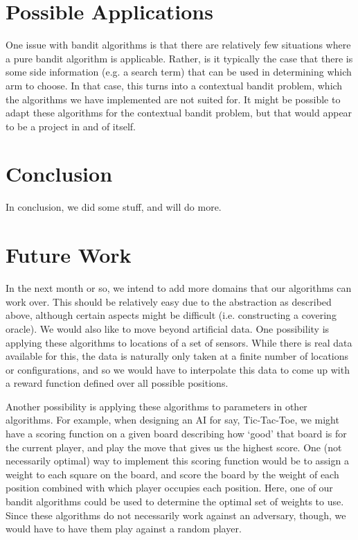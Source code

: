 \documentclass{article}
\begin{document}
\section{Possible Applications}
One issue with bandit algorithms is that there are relatively few
situations where a pure bandit algorithm is applicable.  Rather, is it
typically the case that there is some side information (e.g. a search term)
that can be used in determining which arm to choose.  In that case, this
turns into a contextual bandit problem, which the algorithms we have
implemented are not suited for.  It might be possible to adapt these
algorithms for the contextual bandit problem, but that would appear to be
a project in and of itself.
\\
\section{Conclusion}
In conclusion, we did some stuff, and will do more.
\\
\section{Future Work}
In the next month or so, we intend to add more domains that our algorithms
can work over.  This should be relatively easy due to the abstraction
as described above, although certain aspects might be difficult (i.e.
constructing a covering oracle).  We would also like to move beyond
artificial data.  One possibility is applying these algorithms to
locations of a set of sensors.  While there is real data available for 
this, the data is naturally only taken at a finite number of locations
or configurations, and so we would have to interpolate this data to come
up with a reward function defined over all possible positions.

Another possibility is applying these algorithms to parameters in other
algorithms.  For example, when designing an AI for say, Tic-Tac-Toe, 
we might have a scoring function on a given board describing how
`good' that board is for the current player, and play the move that gives
us the highest score.  One (not necessarily optimal)
way to implement this scoring function would be to assign a weight to each
square on the board, and score the board by the weight of each position
combined with which player occupies each position.  Here, one of our
bandit algorithms could be used to determine the optimal set of weights
to use.  Since these algorithms do not necessarily work against an
adversary, though, we would have to have them play against a random
player.
\end{document}

